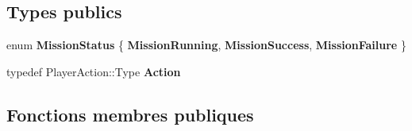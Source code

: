 \subsection*{Types publics}
\begin{DoxyCompactItemize}
\item 
\hypertarget{class_player_add2f7d69e8feab7440fda06be5ccff75}{}\label{class_player_add2f7d69e8feab7440fda06be5ccff75} 
enum {\bfseries Mission\+Status} \{ {\bfseries Mission\+Running}, 
{\bfseries Mission\+Success}, 
{\bfseries Mission\+Failure}
 \}
\item 
\hypertarget{class_player_a9af01bacc4f52ffa3ed79591c3cd9a71}{}\label{class_player_a9af01bacc4f52ffa3ed79591c3cd9a71} 
typedef Player\+Action\+::\+Type {\bfseries Action}
\end{DoxyCompactItemize}
\subsection*{Fonctions membres publiques}
